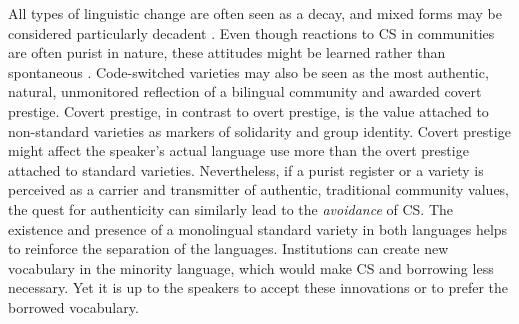 \documentclass[output=paper]{langscibook}
\begin{document}
All types of linguistic change are often seen as a decay, and mixed forms may be considered particularly decadent \parencite{woolard1998introduction}. Even though reactions to CS in communities are often purist in nature, these attitudes might be learned rather than spontaneous \parencite[81--82]{gardner2009code}. Code-switched varieties may also be seen as the most authentic, natural, unmonitored reflection of a bilingual community \parencite{lantto2016conversations} and awarded covert prestige. Covert prestige, in contrast to overt prestige, is the value attached to non-standard varieties as markers of solidarity and group identity. Covert prestige might affect the speaker's actual language use more than the overt prestige attached to standard varieties. Nevertheless, if a purist register or a variety is perceived as a carrier and transmitter of authentic, traditional community values, the quest for authenticity can similarly lead to the \textit{avoidance} of CS. The existence and presence of a monolingual standard variety in both languages helps to reinforce the separation of the languages. Institutions can create new vocabulary in the minority language, which would make CS and borrowing less necessary. Yet it is up to the speakers to accept these innovations or to prefer the borrowed vocabulary.
\end{document}
